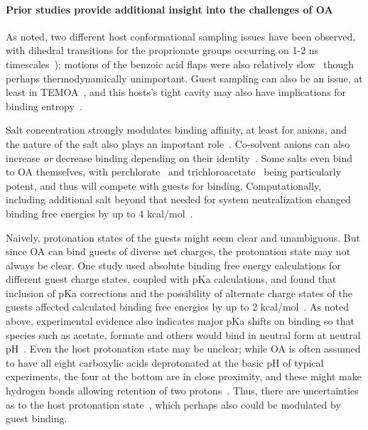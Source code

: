 \documentclass[aps,pre,twocolumn,nofootinbib,superscriptaddress,10pt, final,tightenlines]{revtex4-1}
\begin{document}
\paragraph{Prior studies provide additional insight into the challenges of OA}

As noted, two different host conformational sampling issues have been observed, with dihedral transitions for the proprionate groups occurring on 1-2 ns timescales~\cite{mikulskis_free-energy_2014}); motions of the benzoic acid flaps were also relatively slow~\cite{yin_sampl5_2016, tofoleanu_absolute_2016} though perhaps thermodynamically unimportant. 
Guest sampling can also be an issue, at least in TEMOA~\cite{yin_sampl5_preprint}, and this hosts's tight cavity may also have implications for binding entropy~\cite{yin_sampl5_2016}.

Salt concentration strongly modulates binding affinity, at least for anions, and the nature of the salt also plays an important role~\cite{carnegie_anion_2014}. 
Co-solvent anions can also increase \emph{or} decrease binding depending on their identity~\cite{gibb_anion_2011}. 
Some salts even bind to OA themselves, with perchlorate~\cite{gibb_anion_2011} and trichloroacetate~\cite{sokkalingam_binding_2016} being particularly potent, and thus will compete with guests for binding.  
Computationally, including additional salt beyond that needed for system neutralization changed binding free energies by up to 4 kcal/mol~\cite{tofoleanu_absolute_2016}.  

Naively, protonation states of the guests might seem clear and unambiguous.
But since OA can bind guests of diverse net charges, the protonation state may not always be clear.  
One study used absolute binding free energy calculations for different guest charge states, coupled with pKa calculations, and found that inclusion of pKa corrections and the possibility of alternate charge states of the guests affected calculated binding free energies by up to 2 kcal/mol~\cite{tofoleanu_absolute_2016}. As noted above, experimental evidence also indicates major pKa shifts on binding so that species such as acetate, formate and others would bind in neutral form at neutral pH~\cite{wang_itc_2016, sokkalingam_binding_2016}. 
Even the host protonation state may be unclear; while OA is often assumed to have all eight carboxylic acids deprotonated at the basic pH of typical experiments, the four at the bottom are in close proximity, and these might make hydrogen bonds allowing retention of two protons~\cite{ewell_water_2008}.  
Thus, there are uncertainties as to the host protonation state~\cite{muddana_sampl4_2014, ewell_water_2008}, which perhaps also could be modulated by guest binding.  
\end{document}
